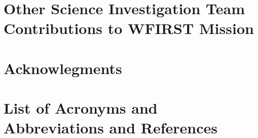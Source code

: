 \documentclass[letter]{ar-1col_WFIRST-HLS}
\newcommand{\Oli}[1]{\textcolor{red}{[{\bf Oli}: #1]}}
\begin{document}
%

\section{Other Science Investigation Team Contributions to WFIRST Mission}
\label{sec:other_contributions}


\section*{Acknowlegments}
\label{sec:acknowledgments}


\newpage

\section*{List of Acronyms and Abbreviations and References}
\label{sec:acronyms}
\vspace{2 cm}


\clearpage
\newpage


%



\clearpage
\newpage
\end{document}
